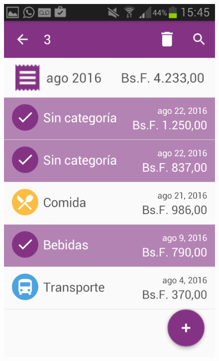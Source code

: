 \begin{figure}[ht]
\centering
\begin{minipage}{.5\textwidth}
  \centering
  \includegraphics[scale=0.30,type=png,ext=.png,read=.png]{imagenes/Screenshots/select_expenses}
  \captionsetup{justification=centering}
  \label{fig:interfazEliminarGastos}
\end{minipage}%
\begin{minipage}{.5\textwidth}
\centering

\end{minipage}
\end{figure}
